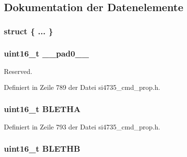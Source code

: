 \subsection{Dokumentation der Datenelemente}
\hypertarget{unionfm__rds__config_a0da16e0321b92cbfbd0016f8346a4484}{}\subsubsection[{"@95}]{\setlength{\rightskip}{0pt plus 5cm}struct \{ ... \} }\label{unionfm__rds__config_a0da16e0321b92cbfbd0016f8346a4484}
\hypertarget{unionfm__rds__config_a77132c2c26a75f5b8751b235cda23828}{}
\subsubsection[{\+\_\+\+\_\+pad0\+\_\+\+\_\+}]{\setlength{\rightskip}{0pt plus 5cm}uint16\+\_\+t \+\_\+\+\_\+pad0\+\_\+\+\_\+}\label{unionfm__rds__config_a77132c2c26a75f5b8751b235cda23828}


Reserved. 



Definiert in Zeile 789 der Datei si4735\+\_\+cmd\+\_\+prop.\+h.

\hypertarget{unionfm__rds__config_ae061939e6d3519d4b231b9da2cab30e9}{}
\subsubsection[{B\+L\+E\+T\+H\+A}]{\setlength{\rightskip}{0pt plus 5cm}uint16\+\_\+t B\+L\+E\+T\+H\+A}\label{unionfm__rds__config_ae061939e6d3519d4b231b9da2cab30e9}


Definiert in Zeile 793 der Datei si4735\+\_\+cmd\+\_\+prop.\+h.

\hypertarget{unionfm__rds__config_a951c1641c0b68c6ef55eab7f22e5d2f4}{}
\subsubsection[{B\+L\+E\+T\+H\+B}]{\setlength{\rightskip}{0pt plus 5cm}uint16\+\_\+t B\+L\+E\+T\+H\+B}\label{unionfm__rds__config_a951c1641c0b68c6ef55eab7f22e5d2f4}


